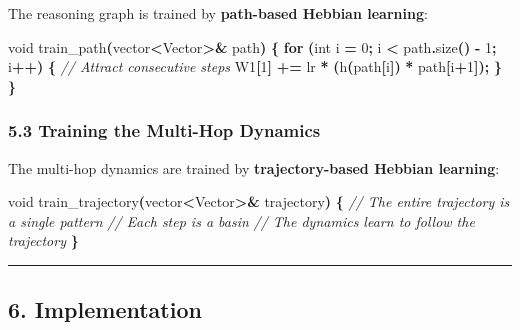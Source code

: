 \documentclass[
  11pt,
  a4paper,
]{article}
\newenvironment{Shaded}{\begin{snugshade}}{\end{snugshade}}
\newcommand{\CommentTok}[1]{\textcolor[rgb]{0.56,0.35,0.01}{\textit{#1}}}
\newcommand{\ControlFlowTok}[1]{\textcolor[rgb]{0.13,0.29,0.53}{\textbf{#1}}}
\newcommand{\DataTypeTok}[1]{\textcolor[rgb]{0.13,0.29,0.53}{#1}}
\newcommand{\DecValTok}[1]{\textcolor[rgb]{0.00,0.00,0.81}{#1}}
\newcommand{\NormalTok}[1]{#1}
\newcommand{\OperatorTok}[1]{\textcolor[rgb]{0.81,0.36,0.00}{\textbf{#1}}}
\begin{document}
The reasoning graph is trained by \textbf{path-based Hebbian learning}:

\begin{Shaded}
\begin{Highlighting}[]
\DataTypeTok{void}\NormalTok{ train\_path}\OperatorTok{(}\NormalTok{vector}\OperatorTok{\textless{}}\NormalTok{Vector}\OperatorTok{\textgreater{}\&}\NormalTok{ path}\OperatorTok{)} \OperatorTok{\{}
    \ControlFlowTok{for} \OperatorTok{(}\DataTypeTok{int}\NormalTok{ i }\OperatorTok{=} \DecValTok{0}\OperatorTok{;}\NormalTok{ i }\OperatorTok{\textless{}}\NormalTok{ path}\OperatorTok{.}\NormalTok{size}\OperatorTok{()} \OperatorTok{{-}} \DecValTok{1}\OperatorTok{;}\NormalTok{ i}\OperatorTok{++)} \OperatorTok{\{}
        \CommentTok{// Attract consecutive steps}
\NormalTok{        W1}\OperatorTok{[}\DecValTok{1}\OperatorTok{]} \OperatorTok{+=}\NormalTok{ lr }\OperatorTok{*} \OperatorTok{(}\NormalTok{h}\OperatorTok{(}\NormalTok{path}\OperatorTok{[}\NormalTok{i}\OperatorTok{])} \OperatorTok{*}\NormalTok{ path}\OperatorTok{[}\NormalTok{i}\OperatorTok{+}\DecValTok{1}\OperatorTok{]);}
    \OperatorTok{\}}
\OperatorTok{\}}
\end{Highlighting}
\end{Shaded}

\subsubsection{5.3 Training the Multi-Hop
Dynamics}\label{training-the-multi-hop-dynamics}

The multi-hop dynamics are trained by \textbf{trajectory-based Hebbian
learning}:

\begin{Shaded}
\begin{Highlighting}[]
\DataTypeTok{void}\NormalTok{ train\_trajectory}\OperatorTok{(}\NormalTok{vector}\OperatorTok{\textless{}}\NormalTok{Vector}\OperatorTok{\textgreater{}\&}\NormalTok{ trajectory}\OperatorTok{)} \OperatorTok{\{}
    \CommentTok{// The entire trajectory is a single pattern}
    \CommentTok{// Each step is a basin}
    \CommentTok{// The dynamics learn to follow the trajectory}
\OperatorTok{\}}
\end{Highlighting}
\end{Shaded}

\begin{center}\rule{0.5\linewidth}{0.5pt}\end{center}

\subsection{6. Implementation}\label{implementation}
\end{document}
